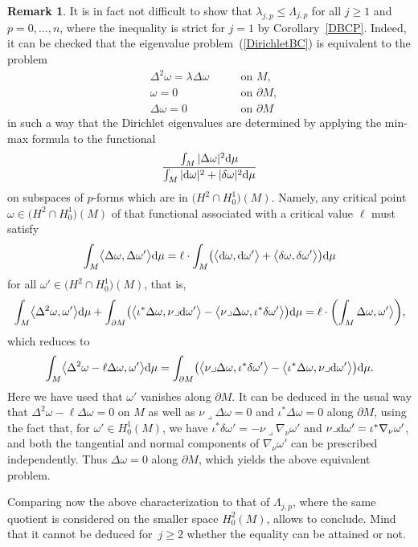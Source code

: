 \documentclass[pdftex]{sigma}
\numberwithin{equation}{section}
\theoremstyle{definition}
\newtheorem{Remark}[Theorem]{Remark}
\begin{document}
\begin{Remark}
It is in fact not difficult to show that $\lambda_{j,p}\leq\Lambda_{j,p}$ for all $j\geq 1$ and $p=0,\dots,n$, where the inequality is strict for $j=1$ by Corollary~\ref{DBCP}.
Indeed, it can be checked that the eigenvalue problem~(\ref{DirichletBC}) is equivalent to the problem
\[
\begin{aligned}
&\Delta^2 \omega =\lambda \Delta\omega \ \quad&&\textrm{on } M, \\
&\omega =0 \ \quad&&\textrm{on }\partial M, \\
&\Delta\omega = 0 \ \quad && \textrm{on }\partial M
\end{aligned}
\]
in such a way that the Dirichlet eigenvalues are determined by applying the min-max formula to the functional
\[
\frac{\int_M|\Delta \omega|^2{\rm d}\mu}{\int_M|{\rm d}\omega|^2+|\delta\omega|^2{\rm d}\mu}
\]
 on subspaces of $p$-forms which are in $\bigl(H^2\cap H_0^1\bigr)(M)$.
Namely, any critical point $\omega\in\bigl(H^2\cap H_0^1\bigr)(M)$ of that functional associated with a critical value $\ell$ must satisfy
\[
\int_M\bigl\langle\Delta\omega,\Delta\omega'\bigr\rangle {\rm d}\mu=\ell\cdot\int_M\bigl(\bigl\langle {\rm d}\omega,{\rm d}\omega'\bigr\rangle+\bigl\langle \delta\omega,\delta\omega'\bigr\rangle\bigr){\rm d}\mu
\]
for all $\omega'\in\bigl(H^2\cap H_0^1\bigr)(M)$, that is,
\[
\int_M\bigl\langle\Delta^2\omega,\omega'\bigr\rangle {\rm d}\mu+\int_{\partial M}\bigl(\bigl\langle\iota^*\Delta\omega,\nu\lrcorner {\rm d}\omega'\bigr\rangle-\bigl\langle\nu\lrcorner\Delta\omega,\iota^*\delta\omega'\bigr\rangle\bigr){\rm d}\mu=\ell\cdot\biggl(\int_M\Delta\omega,\omega'\bigr\rangle\biggr),
\]
which reduces to
\[
\int_M\bigl\langle\Delta^2\omega-\ell\Delta\omega,\omega'\bigr\rangle {\rm d}\mu=\int_{\partial M}\bigl(\bigl\langle\nu\lrcorner\Delta\omega,\iota^*\delta\omega'\bigr\rangle-\bigl\langle\iota^*\Delta\omega,\nu\lrcorner {\rm d}\omega'\bigr\rangle\bigr){\rm d}\mu.
\]
Here we have used that $\omega'$ vanishes along $\partial M$.
It can be deduced in the usual way that ${\Delta^2\omega-\ell\Delta\omega=0}$ on $M$ as well as $\nu\lrcorner\Delta\omega=0$ and $\iota^*\Delta\omega=0$ along $\partial M$, using the fact that, for $\omega'\in H_0^1(M)$, we have $\iota^*\delta\omega'=-\nu\lrcorner\nabla_\nu\omega'$ and $\nu\lrcorner {\rm d}\omega'=\iota^*\nabla_\nu\omega'$, and both the tangential and normal components of $\nabla_\nu\omega'$ can be prescribed independently.
Thus $\Delta\omega=0$ along $\partial M$, which yields the above equivalent problem.

Comparing now the above characterization to that of $\Lambda_{j,p}$, where the same quotient is considered on the smaller space $H^2_0(M)$, allows to conclude.
Mind that it cannot be deduced for~${j\geq2}$ whether the equality can be attained or not.
\end{Remark}
\end{document}
